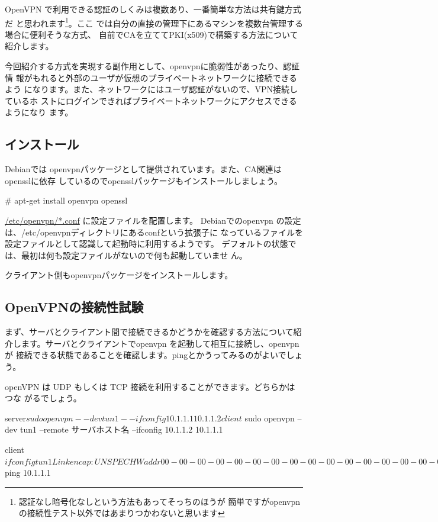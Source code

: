 \documentclass[mingoth,a4paper]{jsarticle}
\begin{document}
OpenVPN で利用できる認証のしくみは複数あり、一番簡単な方法は共有鍵方式だ
と思われます\footnote{認証なし暗号化なしという方法もあってそっちのほうが
簡単ですがopenvpnの接続性テスト以外ではあまりつかわないと思います}。ここ
では自分の直接の管理下にあるマシンを複数台管理する場合に便利そうな方式、
自前でCAを立ててPKI(x509)で構築する方法について紹介します。

今回紹介する方式を実現する副作用として、openvpnに脆弱性があったり、認証情
報がもれると外部のユーザが仮想のプライベートネットワークに接続できるよう
になります。また、ネットワークにはユーザ認証がないので、VPN接続しているホ
ストにログインできればプライベートネットワークにアクセスできるようになり
ます。

\subsection{インストール}

Debianでは openvpnパッケージとして提供されています。また、CA関連はopensslに依存
しているのでopensslパッケージもインストールしましょう。

\begin{commandline}
 # apt-get install openvpn openssl
\end{commandline}

\url{/etc/openvpn/*.conf} に設定ファイルを配置します。 Debianでのopenvpn
の設定は、/etc/openvpnディレクトリにあるconfという拡張子に
なっているファイルを設定ファイルとして認識して起動時に利用するようです。
デフォルトの状態では、最初は何も設定ファイルがないので何も起動していませ
ん。

クライアント側もopenvpnパッケージをインストールします。

\subsection{OpenVPNの接続性試験}

まず、サーバとクライアント間で接続できるかどうかを確認する方法について紹
介します。サーバとクライアントでopenvpn を起動して相互に接続し、openvpnが
接続できる状態であることを確認します。pingとかうってみるのがよいでしょう。

openVPN は UDP もしくは TCP 接続を利用することができます。どちらかはつな
がるでしょう。

\begin{commandline}
 server$ sudo openvpn --dev tun1 --ifconfig 10.1.1.1 10.1.1.2 
 client$ sudo openvpn --dev tun1 --remote サーバホスト名 --ifconfig 10.1.1.2 10.1.1.1 

 client$ ifconfig
 tun1      Link encap:UNSPEC  HWaddr 00-00-00-00-00-00-00-00-00-00-00-00-00-00-00-00  
          inet addr:10.1.1.2  P-t-P:10.1.1.1  Mask:255.255.255.255
          UP POINTOPOINT RUNNING NOARP MULTICAST  MTU:1500  Metric:1
          RX packets:2 errors:0 dropped:0 overruns:0 frame:0
          TX packets:2 errors:0 dropped:0 overruns:0 carrier:0
          collisions:0 txqueuelen:100 
          RX bytes:168 (168.0 B)  TX bytes:168 (168.0 B)
 client$ ping 10.1.1.1

\end{commandline}
\end{document}

